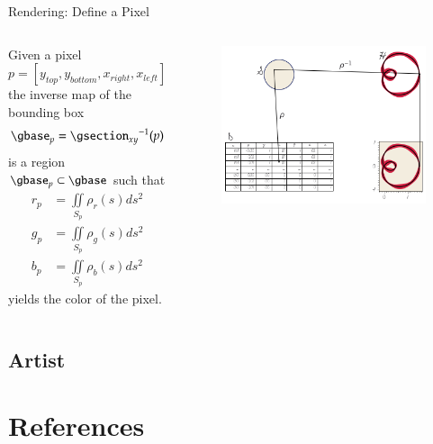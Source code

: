 \documentclass[xcolor={dvipsnames}, handout]{beamer}
\begin{document}
\begin{frame}{Rendering: Define a Pixel}
    \begin{columns}
        Given a pixel
        \begin{equation}
        p=\left[y_{top}, y_{bottom}, x_{right}, x_{left}\right]
        \end{equation}
        the inverse map of the bounding box 
        \begin{equation}
        \gbase_{p} ={\gsection_{xy}}^{-1}(p)
        \end{equation}
        is a region $\gbase_p \subset \gbase$ such that 
        \begin{align}
            \scriptstyle r_p &= \scriptstyle \iint\limits_{S_p} \rho_r(s)ds^{2}\\
            \scriptstyle g_p &= \scriptstyle \iint\limits_{S_p} \rho_g(s)ds^{2}\\
            \scriptstyle  b_p &= \scriptstyle \iint\limits_{S_p} \rho_b(s)ds^{2}
        \end{align}
        yields the color of the pixel. 
        \begin{figure}[H]
            \includegraphics[width=\textwidth]{figures/math/render.png}
        \end{figure}
    \end{columns}
\end{frame}

\subsection{Artist}



\section{References}
\end{document}
